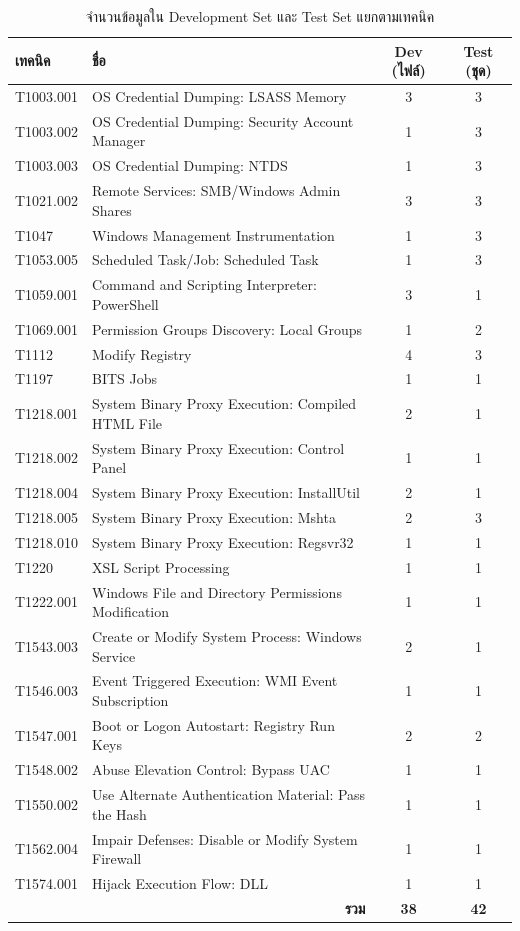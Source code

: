 \begin{table}[ht]
  \centering
  \caption{จำนวนข้อมูลใน Development Set และ Test Set แยกตามเทคนิค}
  \label{tab:dev-test}
  \small
  \begin{tabular}{|l|l|c|c|}
    \hline
    \textbf{เทคนิค} & \textbf{ชื่อ} & \textbf{Dev (ไฟล์)} & \textbf{Test (ชุด)} \\ \hline
    T1003.001 & OS Credential Dumping: LSASS Memory & 3 & 3 \\ \hline
    T1003.002 & OS Credential Dumping: Security Account Manager & 1 & 3 \\ \hline
    T1003.003 & OS Credential Dumping: NTDS & 1 & 3 \\ \hline
    T1021.002 & Remote Services: SMB/Windows Admin Shares & 3 & 3 \\ \hline
    T1047     & Windows Management Instrumentation & 1 & 3 \\ \hline
    T1053.005 & Scheduled Task/Job: Scheduled Task & 1 & 3 \\ \hline
    T1059.001 & Command and Scripting Interpreter: PowerShell & 3 & 1 \\ \hline
    T1069.001 & Permission Groups Discovery: Local Groups & 1 & 2 \\ \hline
    T1112     & Modify Registry & 4 & 3 \\ \hline
    T1197     & BITS Jobs & 1 & 1 \\ \hline
    T1218.001 & System Binary Proxy Execution: Compiled HTML File & 2 & 1 \\ \hline
    T1218.002 & System Binary Proxy Execution: Control Panel & 1 & 1 \\ \hline
    T1218.004 & System Binary Proxy Execution: InstallUtil & 2 & 1 \\ \hline
    T1218.005 & System Binary Proxy Execution: Mshta & 2 & 3 \\ \hline
    T1218.010 & System Binary Proxy Execution: Regsvr32 & 1 & 1 \\ \hline
    T1220     & XSL Script Processing & 1 & 1 \\ \hline
    T1222.001 & Windows File and Directory Permissions Modification & 1 & 1 \\ \hline
    T1543.003 & Create or Modify System Process: Windows Service & 2 & 1 \\ \hline
    T1546.003 & Event Triggered Execution: WMI Event Subscription & 1 & 1 \\ \hline
    T1547.001 & Boot or Logon Autostart: Registry Run Keys & 2 & 2 \\ \hline
    T1548.002 & Abuse Elevation Control: Bypass UAC & 1 & 1 \\ \hline
    T1550.002 & Use Alternate Authentication Material: Pass the Hash & 1 & 1 \\ \hline
    T1562.004 & Impair Defenses: Disable or Modify System Firewall & 1 & 1 \\ \hline
    T1574.001 & Hijack Execution Flow: DLL & 1 & 1 \\ \hline
    \multicolumn{2}{|r|}{\textbf{รวม}} & \textbf{38} & \textbf{42} \\ \hline
  \end{tabular}
\end{table}

